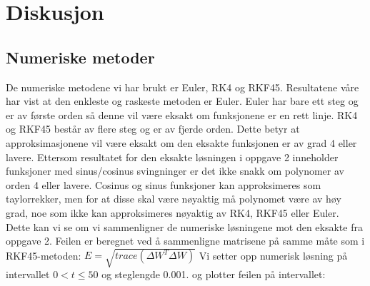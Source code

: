 \section{Diskusjon}
\label{section:diskusjon} 
\subsection{Numeriske metoder}
De numeriske metodene vi har brukt er Euler, RK4 og RKF45. Resultatene våre har vist at den enkleste og raskeste metoden er Euler. Euler har bare ett steg og er av første orden så denne vil være eksakt om funksjonene er en rett linje. RK4 og RKF45 består av flere steg og er av fjerde orden. Dette betyr at approksimasjonene vil være eksakt om den eksakte funksjonen er av grad 4 eller lavere. Ettersom resultatet for den eksakte løsningen i oppgave 2 inneholder funksjoner med sinus/cosinus svingninger er det ikke snakk om polynomer av orden 4 eller lavere. Cosinus og sinus funksjoner kan approksimeres som taylorrekker, men for at disse skal være nøyaktig må polynomet være av høy grad, noe som ikke kan approksimeres nøyaktig av RK4, RKF45 eller Euler. Dette kan vi se om vi sammenligner de numeriske løsningene mot den eksakte fra oppgave 2. Feilen er beregnet ved å sammenligne matrisene på samme måte som i RKF45-metoden: \newline
$E = \sqrt{trace(\Delta W^T \Delta W)}$ \newline 
Vi setter opp numerisk løsning på intervallet $0<t\leq50$ og steglengde 0.001. og plotter feilen på intervallet: \newline\newline
